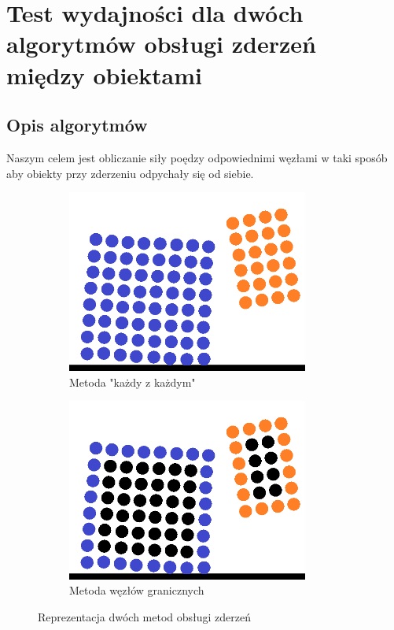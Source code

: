 \documentclass[12pt, letterpaper]{report}
\begin{document}
    \section{Test wydajności dla dwóch algorytmów obsługi zderzeń między obiektami}
    \subsection{Opis algorytmów}
    Naszym celem jest obliczanie siły poędzy odpowiednimi węzłami w taki sposób aby 
    obiekty przy zderzeniu odpychały się od siebie.
    
    \begin{figure}[h]

        \begin{subfigure}{0.5\textwidth}
        \includegraphics[width=0.9\linewidth, height=6cm]{objects_unoptimized} 
        \caption{Metoda "każdy z każdym"}
        \end{subfigure}
        \begin{subfigure}{0.5\textwidth}
        \includegraphics[width=0.9\linewidth, height=6cm]{objects_optimized}
        \caption{Metoda węzłów granicznych}
        \end{subfigure}
        
        \caption{Reprezentacja dwóch metod obsługi zderzeń}
    \end{figure}
\end{document}
